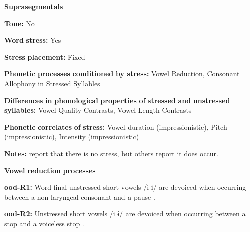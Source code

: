 \documentclass[output=paper]{langsci/langscibook}
\begin{document}
\begin{styleBody}
\textbf{Suprasegmentals}
\end{styleBody}

\begin{styleBody}
\textbf{Tone:} No
\end{styleBody}

\begin{styleBody}
\textbf{Word} \textbf{stress:} Yes
\end{styleBody}

\begin{styleBody}
\textbf{Stress} \textbf{placement:} Fixed
\end{styleBody}

\begin{styleBody}
\textbf{Phonetic} \textbf{processes} \textbf{conditioned} \textbf{by} \textbf{stress:} Vowel Reduction, Consonant Allophony in Stressed Syllables
\end{styleBody}

\begin{styleBody}
\textbf{Differences} \textbf{in} \textbf{phonological} \textbf{properties} \textbf{of} \textbf{stressed} \textbf{and} \textbf{unstressed} \textbf{syllables:} Vowel Quality Contrasts, Vowel Length Contrasts
\end{styleBody}

\begin{styleBody}
\textbf{Phonetic} \textbf{correlates} \textbf{of} \textbf{stress:} Vowel duration (impressionistic), Pitch (impressionistic), Intensity (impressionistic)
\end{styleBody}

\begin{styleBody}
\textbf{Notes:} \citet{DoloresMathiot1991} report that there is no stress, but others report it does occur.
\end{styleBody}

\begin{styleBody}
\textbf{Vowel} \textbf{reduction} \textbf{processes}
\end{styleBody}

\begin{styleBody}
\textbf{ood-R1:} Word-final unstressed short vowels /i ɨ/ are devoiced when occurring between a non-laryngeal consonant and a pause \citep[31]{Saxton1963}.
\end{styleBody}

\begin{styleBody}
\textbf{ood-R2:} Unstressed short vowels /i ɨ/ are devoiced when occurring between a stop and a voiceless stop \citep[31]{Saxton1963}.
\end{styleBody}
\end{document}
